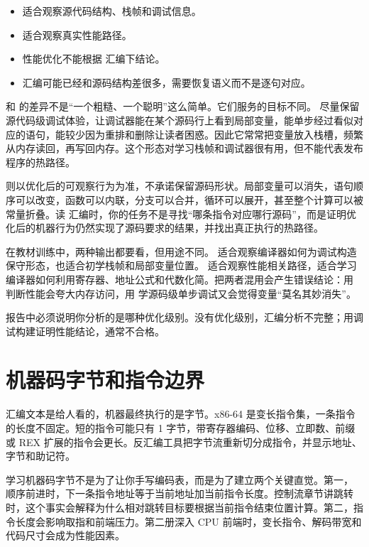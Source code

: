 \begin{itemize}
  \item {} 适合观察源代码结构、栈帧和调试信息。
  \item {} 适合观察真实性能路径。
  \item 性能优化不能根据  汇编下结论。
  \item {} 汇编可能已经和源码结构差很多，需要恢复语义而不是逐句对应。
\end{itemize}

 和  的差异不是“一个粗糙、一个聪明”这么简单。它们服务的目标不同。 尽量保留源代码级调试体验，让调试器能在某个源码行上看到局部变量，能单步经过看似对应的语句，能较少因为重排和删除让读者困惑。因此它常常把变量放入栈槽，频繁从内存读回，再写回内存。这个形态对学习栈帧和调试器很有用，但不能代表发布程序的热路径。

 则以优化后的可观察行为为准，不承诺保留源码形状。局部变量可以消失，语句顺序可以改变，函数可以内联，分支可以合并，循环可以展开，甚至整个计算可以被常量折叠。读  汇编时，你的任务不是寻找“哪条指令对应哪行源码”，而是证明优化后的机器行为仍然实现了源码要求的结果，并找出真正执行的热路径。

在教材训练中，两种输出都要看，但用途不同。 适合观察编译器如何为调试构造保守形态，也适合初学栈帧和局部变量位置。 适合观察性能相关路径，适合学习编译器如何利用寄存器、地址公式和代数化简。把两者混用会产生错误结论：用  判断性能会夸大内存访问，用  学源码级单步调试又会觉得变量“莫名其妙消失”。

\begin{warningbox}
报告中必须说明你分析的是哪种优化级别。没有优化级别，汇编分析不完整；用调试构建证明性能结论，通常不合格。
\end{warningbox}

\section{机器码字节和指令边界}

汇编文本是给人看的，机器最终执行的是字节。x86-64 是变长指令集，一条指令的长度不固定。短的指令可能只有 1 字节，带寄存器编码、位移、立即数、前缀或 REX 扩展的指令会更长。反汇编工具把字节流重新切分成指令，并显示地址、字节和助记符。

学习机器码字节不是为了让你手写编码表，而是为了建立两个关键直觉。第一， 顺序前进时，下一条指令地址等于当前地址加当前指令长度。控制流章节讲跳转时，这个事实会解释为什么相对跳转目标要根据当前指令结束位置计算。第二，指令长度会影响取指和前端压力。第二册深入 CPU 前端时，变长指令、解码带宽和代码尺寸会成为性能因素。

